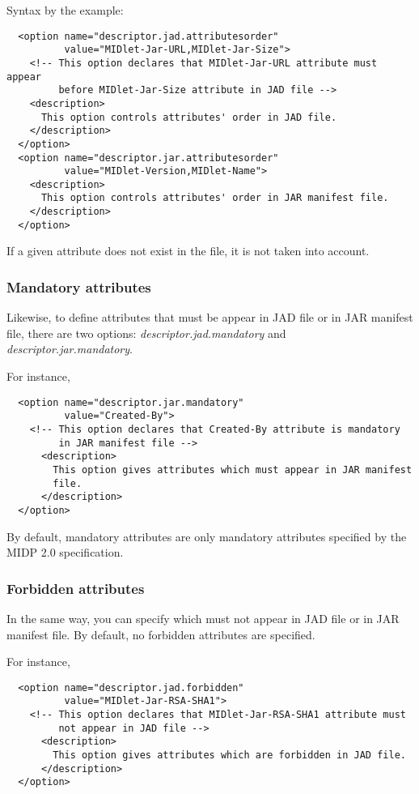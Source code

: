 Syntax by the example:
\begin{verbatim}
  <option name="descriptor.jad.attributesorder" 
          value="MIDlet-Jar-URL,MIDlet-Jar-Size">
    <!-- This option declares that MIDlet-Jar-URL attribute must appear
         before MIDlet-Jar-Size attribute in JAD file -->
    <description>
      This option controls attributes' order in JAD file.
    </description>
  </option>
  <option name="descriptor.jar.attributesorder" 
          value="MIDlet-Version,MIDlet-Name">
    <description>
      This option controls attributes' order in JAR manifest file.
    </description>
  </option>
\end{verbatim}

If a given attribute does not exist in the file, it is not taken into account.

\subsubsection{Mandatory attributes}
Likewise, to define attributes that must be appear in JAD file or in JAR
manifest file, there are two options: \emph{descriptor.jad.mandatory} and
\emph{descriptor.jar.mandatory}. 

For instance,
\begin{verbatim}
  <option name="descriptor.jar.mandatory"
          value="Created-By">
    <!-- This option declares that Created-By attribute is mandatory
         in JAR manifest file -->
      <description>
        This option gives attributes which must appear in JAR manifest 
 		file.
      </description>
  </option>
\end{verbatim}

By default, mandatory attributes are only mandatory attributes specified by the
MIDP 2.0 specification.

\subsubsection{Forbidden attributes}
In the same way, you can specify which must not appear in JAD file or in JAR
manifest file. By default, no forbidden attributes are specified.

For instance,
\begin{verbatim}
  <option name="descriptor.jad.forbidden"
          value="MIDlet-Jar-RSA-SHA1">
    <!-- This option declares that MIDlet-Jar-RSA-SHA1 attribute must 
         not appear in JAD file -->
      <description>
        This option gives attributes which are forbidden in JAD file.
      </description>
  </option>
\end{verbatim}

